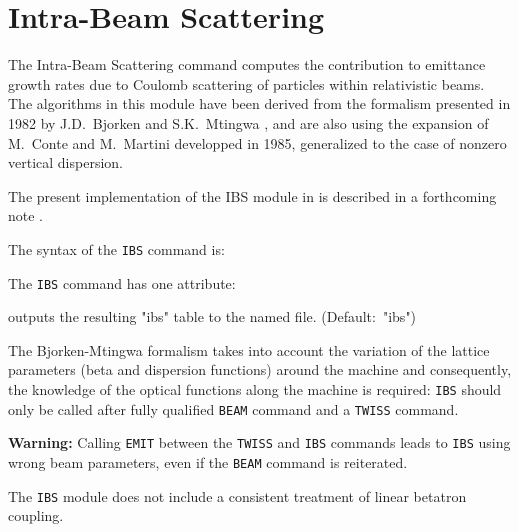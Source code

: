 


\chapter{Intra-Beam Scattering}
\label{chap:ibs}

The Intra-Beam Scattering command computes the contribution to emittance
growth rates due to Coulomb scattering of particles within relativistic
beams. The algorithms in this module have been derived from the formalism
presented in 1982 by J.D.~Bjorken and S.K.~Mtingwa
\cite{bjorken-mtingwa1982}, and are also using the expansion of M.~Conte
and M.~Martini \cite{conte-martini1985} developped in 1985, generalized
to the case of nonzero vertical dispersion.  

The present implementation of the IBS module in \madx is described in a
forthcoming note  \cite{antoniou-zimmermann2012}.


The syntax of the \texttt{IBS} command is:

The \texttt{IBS} command has one attribute:
\begin{madlist}
   outputs the resulting "ibs" table to
  the named file. (Default:~"ibs")
\end{madlist}

The Bjorken-Mtingwa formalism takes into account the variation of the
lattice parameters (beta and dispersion functions) around the
machine and consequently, the knowledge of the optical functions along
the machine is required: \texttt{IBS} should only be called after fully
qualified \texttt{BEAM} command and a \texttt{TWISS} command. 

\textbf{Warning:} Calling \texttt{EMIT} between the \texttt{TWISS} and
\texttt{IBS} commands leads to \texttt{IBS} using wrong beam parameters,
even if the \texttt{BEAM} command is reiterated.

The \texttt{IBS} module does not include a consistent treatment of
linear betatron coupling.   

